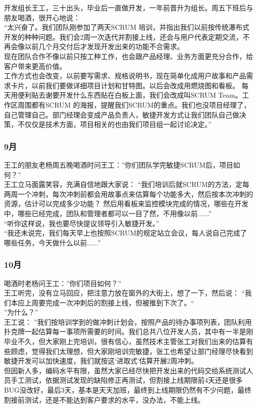 开发组长王工，三十出头，毕业后一直做开发，一年前晋升为组长。周五下班后与朋友喝酒，很开心地说：\\
“太兴奋了。我们团队刚参加了两天SCRUM 培训，并指出我们以前按传统瀑布式开发的种种问题。我们会2周一次迭代并割接上线，还会与用户代表定期交流，不再会像以前几个月交付后才发现开发出来的功能不合需求。\\
现在团队合作不像以前只按工种工作，也会跟产品经理、业务方面更充分合作，给客户带来更高价值。\\
工作方式也会改变，以前要写需求、规格说明书，现在简单化成用户故事和产品需求卡片，以前我们要做详细项目计划和甘特图。以后会改成用燃烧图和看板。 每天用便利贴去谢要开发什么东西贴在白板上面，我们会改成叫SCRUM Team。工作区周围都有SCRUM 的海报，提醒我们SCRUM的重点。我们也没项目经理了，自己管理自己。部门经理会变成产品负责人，敏捷开发方式让我们团队自己做决策，不仅仅是技术方面，项目相关的也由我们项目组一起讨论决定。”\\

\hypertarget{ux6708-2}{%
\subsubsection{9月}\label{ux6708-2}}

王工的朋友老杨周五晚喝酒时问王工：”你们团队学完敏捷SCRUM后，项目如何？”\\
王工立马面露笑容，充满自信地跟大家说：
``我们培训后就SCRUM的方法，定每两周一个冲刺，每次冲刺前都会用故事点来估算每个功能多大，然后按本次冲刺的资源，估计可以完成多少功能？
然后用看板来监控模块完成的情况，哪些在开发中，哪些已经完成，团队和管理者都可以一目了然，不用像以前......”\\
“听你这样说，我也要尽快提议领导引入敏捷开发。”\\
“我还未说完，我们每天早上也按照SCRUM的规定站立会议，每人说自己完成了哪些任务，今天做什么以前......”\\

\hypertarget{ux6708-3}{%
\subsubsection{10月}\label{ux6708-3}}

喝酒时老杨问王工：”你们项目如何？”\\
王工听完，没有立马回应，把注意力放在窗外的大街上，想了一下，然后说：
``我们本应上周要完成一次冲刺后的割接上线，但被推到下次了。``\\
''为什么？''\\
王工说：
''我们按培训学到的做冲刺计划会，按照产品的待办事项列表，团队利用扑克牌一起估算每一事项所需要的时间。我们总共八位开发人员，其中有一半是刚毕业不久，但大家刚上完培训，很有信心，虽然技术主管张工对我们出来的估算有些顾虑，觉得我们太理想，但大家刚培训完敏捷，张工也希望让部门经理尽快看到敏捷开发可以加快速度，我们就按这`进取式'估算开展2周冲刺。\\
但因新人多，编码水平有限，虽然大家已经尽快把开发出来的代码交给系统测试人员手工测试，依据测试发现的缺陷修正再测试，但割接上线期限前4天还是很多BUG没改好，最后3天，基本是天天加班，最终到上线期限仍然有不少问题，最终割接前测试，还是不能达到客户要求的水平，没办法，不能上线。

